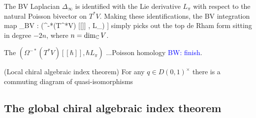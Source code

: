 \documentclass[10pt]{amsart}
\def\brian{\textcolor{blue}{BW: }\textcolor{blue}}
\begin{document}
The BV Laplacian $\Delta_\infty$ is identified with the Lie derivative $L_\pi$ with respect to the natural Poisson bivector on $T^*V$. 
Making these identifications, the BV integration map
\ben
\int_{BV} : \left(\Omega^{-*}(T^*V) [[\hbar]] , \hbar L_\pi\right) \to \CC[[\hbar]]
\een
simply picks out the top de Rham form sitting in degree $-2n$, where $n = \dim_\mathbb C V$. 

\begin{rmk} The $\left(\Omega^{-*}(T^*V) [[\hbar]] , \hbar L_\pi\right)$ ...Poisson homology \brian{finish}.
\end{rmk}


\begin{thm} (Local chiral algebraic index theorem) For any $q \in D(0,1)^\times$ there is a commuting diagram of quasi-isomorphisms
\ben
{}
\een
\end{thm}

\subsection{The global chiral algebraic index theorem}
\end{document}
